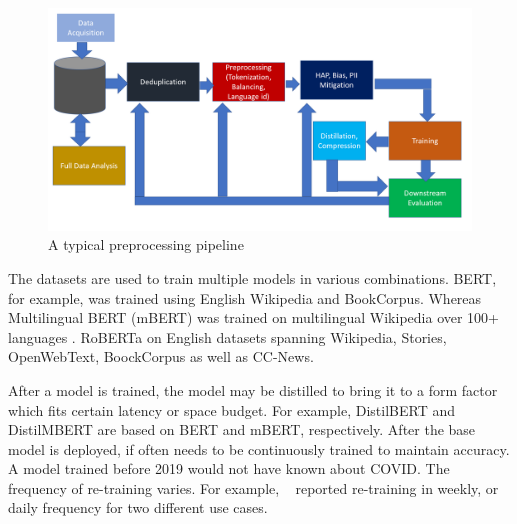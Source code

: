 {{         \begin{figure}[!t]
             \centering
             \includegraphics[width = \linewidth]{Figures/sustain3.png}
             \caption{A typical preprocessing pipeline}
             \label{fig:model-preprocess}
         \end{figure}

        The datasets are used to train multiple models in various combinations. BERT, for example, was trained using English Wikipedia and BookCorpus. Whereas Multilingual BERT (mBERT) was trained on multilingual Wikipedia over 100+ languages \cite{Jindrich2019}. RoBERTa on English datasets spanning Wikipedia, Stories, OpenWebText, BoockCorpus as well as CC-News. 

        After a model is trained, the model may be distilled to bring it to a form factor which fits certain latency or space budget. For example,  DistilBERT \cite{Sanh2019} and DistilMBERT are based on BERT and mBERT, respectively. After the base model is deployed, if often needs to be continuously trained to maintain accuracy. A model trained before 2019 would not have known about COVID. The frequency of re-training varies. For example, ~\cite{Wu2022} reported re-training in weekly, or daily frequency for two different use cases. 
    }
}

